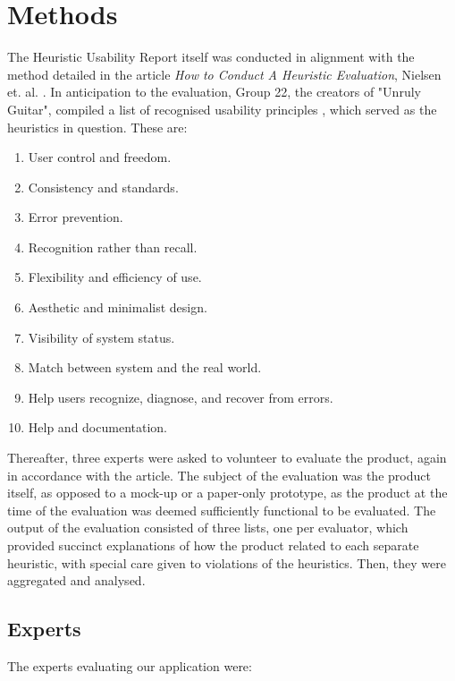 \section{Methods}

The Heuristic Usability Report itself was conducted in alignment with the method detailed in the article \emph{How to Conduct A Heuristic Evaluation}, Nielsen et. al. \cite{how-to-coduct-a-heuristic-evaluation}. In anticipation to the evaluation, Group 22, the creators of "Unruly Guitar", compiled a list of recognised usability principles \cite{list-of-heuristics}, which served as the heuristics in question. These are:

\begin{enumerate}
    \item User control and freedom.
    \item Consistency and standards.
    \item Error prevention.
    \item Recognition rather than recall.
    \item Flexibility and efficiency of use.
    \item Aesthetic and minimalist design.
    \item Visibility of system status.
    \item Match between system and the real world.
    \item Help users recognize, diagnose, and recover from errors.
    \item Help and documentation.
\end{enumerate} 

Thereafter, three experts were asked to volunteer to evaluate the product, again in accordance with the article. The subject of the evaluation was the product itself, as opposed to a mock-up or a paper-only prototype, as the product at the time of the evaluation was deemed sufficiently functional to be evaluated. The output of the evaluation consisted of three lists, one per evaluator, which provided succinct explanations of how the product related to each separate heuristic, with special care given to violations of the heuristics. Then, they were aggregated and analysed.

\subsection{Experts}

The experts evaluating our application were:

